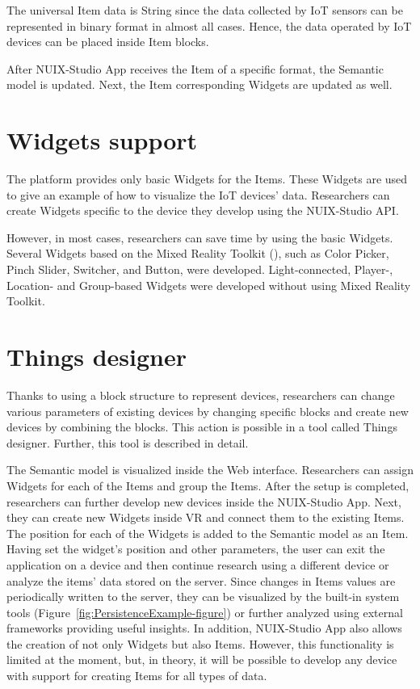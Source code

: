 The universal Item data is String since the data collected by IoT sensors can be represented in binary format in almost all cases. Hence, the data operated by IoT devices can be placed inside Item blocks.

After NUIX-Studio App receives the Item of a specific format, the Semantic model is updated. Next, the Item corresponding Widgets are updated as well.

\section{Widgets support}

The platform provides only basic Widgets for the Items. These Widgets are used to give an example of how to visualize the IoT devices' data. Researchers can create Widgets specific to the device they develop using the NUIX-Studio API.

However, in most cases, researchers can save time by using the basic Widgets. Several Widgets based on the Mixed Reality Toolkit (\cite{MRTK2021}), such as Color Picker, Pinch Slider, Switcher, and Button, were developed. Light-connected, Player-, Location- and Group-based Widgets were developed without using Mixed Reality Toolkit.

\section{Things designer}

Thanks to using a block structure to represent devices, researchers can change various parameters of existing devices by changing specific blocks and create new devices by combining the blocks. This action is possible in a tool called Things designer. Further, this tool is described in detail.

The Semantic model is visualized inside the Web interface. Researchers can assign Widgets for each of the Items and group the Items. After the setup is completed, researchers can further develop new devices inside the NUIX-Studio App. Next, they can create new Widgets inside VR and connect them to the existing Items. The position for each of the Widgets is added to the Semantic model as an Item. Having set the widget's position and other parameters, the user can exit the application on a device and then continue research using a different device or analyze the items' data stored on the server. Since changes in Items values are periodically written to the server, they can be visualized by the built-in system tools (Figure~\ref{fig:PersistenceExample-figure}) or further analyzed using external frameworks providing useful insights. In addition, NUIX-Studio App also allows the creation of not only Widgets but also Items. However, this functionality is limited at the moment, but, in theory, it will be possible to develop any device with support for creating Items for all types of data.

